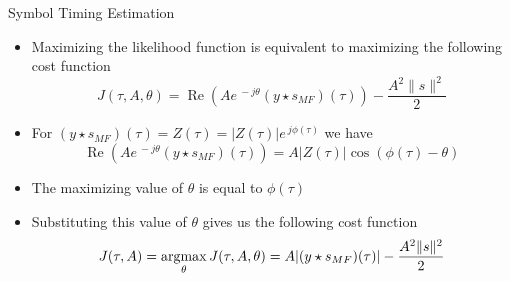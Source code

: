 \documentclass[t]{beamer}
\newcommand{\argmax}{\operatornamewithlimits{argmax}}
\renewcommand\Re{\operatorname{Re}}
\begin{document}
\begin{frame}{Symbol Timing Estimation}
  \footnotesize
  \begin{itemize}
    \item Maximizing the likelihood function is equivalent to maximizing the following cost function
      \begin{equation*}
        J(\tau, A, \theta) = \Re\left( Ae^{\ -j\theta}(y\star s_{MF})(\tau)\right) - \frac{A^2 \lVert s \rVert^2}{2}
      \end{equation*}
    \item \pause For $(y\star s_{MF})(\tau) = Z(\tau) = \lvert Z(\tau) \rvert e^{\ j\phi(\tau)}$ we have
      \begin{equation*}
        \Re\left( Ae^{\ -j\theta} (y\star s_{MF})(\tau)\right)  = A \lvert Z(\tau) \rvert \cos(\phi(\tau) - \theta)
      \end{equation*}
    \item \pause The maximizing value of $\theta$ is equal to $\phi(\tau)$
    \item \pause Substituting this value of $\theta$ gives us the following cost function
      \begin{equation*}
        J(\tau, A) = \argmax_{\theta} J(\tau, A, \theta) = A\lvert (y\star s_{MF})(\tau)\rvert - \frac{A^2 \lVert s \rVert^2}{2}
      \end{equation*}
  \end{itemize}
  \normalsize
\end{frame}
\end{document}
